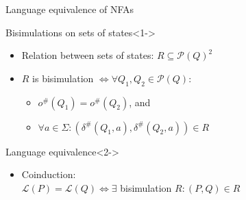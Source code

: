 \documentclass[compress]{beamer}
\begin{document}


\begin{frame}{Language equivalence of NFAs}
  \begin{block}{Bisimulations on sets of states}<1->
    \begin{itemize}
      \item Relation between sets of states: $R \subseteq \mathcal{P}(Q)^2$%
      \item $R$ is bisimulation $\iff \forall Q_1, Q_2 \in \mathcal{P}(Q): $
        \begin{itemize}
          \item $o^\#(Q_1) = o^\#(Q_2)$, and
          \item $\forall a \in \Sigma: (\delta^\#(Q_1, a), \delta^\#(Q_2, a)) \in R$
        \end{itemize}
    \end{itemize}
  \end{block}

  \begin{block}{Language equivalence}<2->
    \begin{itemize}
      \item
      Coinduction:\\
        $\mathcal{L}(P) = \mathcal{L}(Q) \iff \exists$ bisimulation $R: (P, Q) \in R$
    \end{itemize}
  \end{block}
\end{frame}
\end{document}
